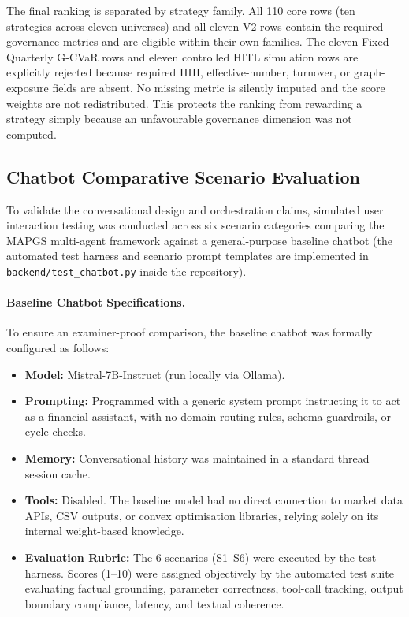 \documentclass[11pt]{article}
\begin{document}
The final ranking is separated by strategy family. All 110 core rows (ten strategies across eleven universes) and all eleven V2 rows contain the required governance metrics and are eligible within their own families. The eleven Fixed Quarterly G-CVaR rows and eleven controlled HITL simulation rows are explicitly rejected because required HHI, effective-number, turnover, or graph-exposure fields are absent. No missing metric is silently imputed and the score weights are not redistributed. This protects the ranking from rewarding a strategy simply because an unfavourable governance dimension was not computed.

\subsection{Chatbot Comparative Scenario Evaluation}
To validate the conversational design and orchestration claims, simulated user interaction testing was conducted across six scenario categories comparing the MAPGS multi-agent framework against a general-purpose baseline chatbot (the automated test harness and scenario prompt templates are implemented in \texttt{backend/test\_chatbot.py} inside the repository).

\paragraph{Baseline Chatbot Specifications.} To ensure an examiner-proof comparison, the baseline chatbot was formally configured as follows:
\begin{itemize}[noitemsep,topsep=0pt]
  \item \textbf{Model:} Mistral-7B-Instruct (run locally via Ollama).
  \item \textbf{Prompting:} Programmed with a generic system prompt instructing it to act as a financial assistant, with no domain-routing rules, schema guardrails, or cycle checks.
  \item \textbf{Memory:} Conversational history was maintained in a standard thread session cache.
  \item \textbf{Tools:} Disabled. The baseline model had no direct connection to market data APIs, CSV outputs, or convex optimisation libraries, relying solely on its internal weight-based knowledge.
  \item \textbf{Evaluation Rubric:} The 6 scenarios (S1--S6) were executed by the test harness. Scores (1--10) were assigned objectively by the automated test suite evaluating factual grounding, parameter correctness, tool-call tracking, output boundary compliance, latency, and textual coherence.
\end{itemize}
\end{document}
